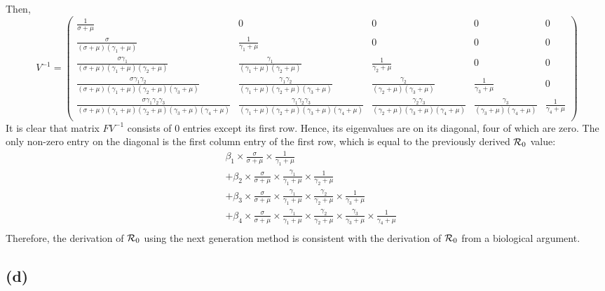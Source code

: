 \documentclass{article}
\begin{document}
Then,
$$
V^{-1} = \begin{pmatrix}
\frac{1}{\sigma + \mu} & 0 & 0 & 0 & 0\\
\frac{\sigma}{(\sigma + \mu)(\gamma_1 + \mu)} & \frac{1}{\gamma_1 + \mu} & 0 & 0 & 0\\
\frac{\sigma \gamma_1}{(\sigma + \mu)(\gamma_1 + \mu)(\gamma_2 + \mu)} & \frac{\gamma_1}{(\gamma_1 + \mu)(\gamma_2 + \mu)} & \frac{1}{\gamma_2 + \mu} & 0 & 0\\
\frac{\sigma \gamma_1 \gamma_2}{(\sigma + \mu)(\gamma_1 + \mu)(\gamma_2 + \mu)(\gamma_3 + \mu)} & \frac{\gamma_1 \gamma_2}{(\gamma_1 + \mu)(\gamma_2 + \mu)(\gamma_3 + \mu)} & \frac{\gamma_2}{(\gamma_2 + \mu)(\gamma_3 + \mu)} & \frac{1}{\gamma_3 + \mu} & 0\\
\frac{\sigma \gamma_1 \gamma_2 \gamma_3}{(\sigma + \mu)(\gamma_1 + \mu)(\gamma_2 + \mu)(\gamma_3 + \mu)(\gamma_4  +\mu)} & \frac{\gamma_1 \gamma_2 \gamma_3}{(\gamma_1 + \mu)(\gamma_2 + \mu)(\gamma_3 + \mu)(\gamma_4  +\mu)} & \frac{\gamma_2 \gamma_3}{(\gamma_2 + \mu)(\gamma_3 + \mu)(\gamma_4  +\mu)} & \frac{\gamma_3}{(\gamma_3 + \mu)(\gamma_4  +\mu)} & \frac{1}{\gamma_4  +\mu}\\
\end{pmatrix}
$$
It is clear that matrix $FV^{-1}$ consists of 0 entries except its first row.
Hence, its eigenvalues are on its diagonal, four of which are zero. The only non-zero entry on the diagonal is the first column entry of the first row, which is equal to the previously derived ${\cal R}_0$ value:
$$
\begin{aligned}
&\beta_1 \times \frac{\sigma}{\sigma + \mu} \times \frac{1}{\gamma_1 + \mu}\\
&+ \beta_2 \times \frac{\sigma}{\sigma + \mu} \times \frac{\gamma_1}{\gamma_1 + \mu} \times \frac{1}{\gamma_2 + \mu}\\
&+ \beta_3 \times \frac{\sigma}{\sigma + \mu} \times \frac{\gamma_1}{\gamma_1 + \mu} \times \frac{\gamma_2}{\gamma_2 + \mu} \times \frac{1}{\gamma_3 + \mu}\\
&+ \beta_4 \times \frac{\sigma}{\sigma + \mu} \times \frac{\gamma_1}{\gamma_1 + \mu} \times \frac{\gamma_2}{\gamma_2 + \mu} \times \frac{\gamma_3}{\gamma_3 + \mu} \times \frac{1}{\gamma_4 + \mu}\\
\end{aligned}
$$
Therefore, the derivation of ${\cal R}_0$ using the next generation method is consistent with the derivation of ${\cal R}_0$ from a biological argument.

\subsection*{(d)}
\end{document}

